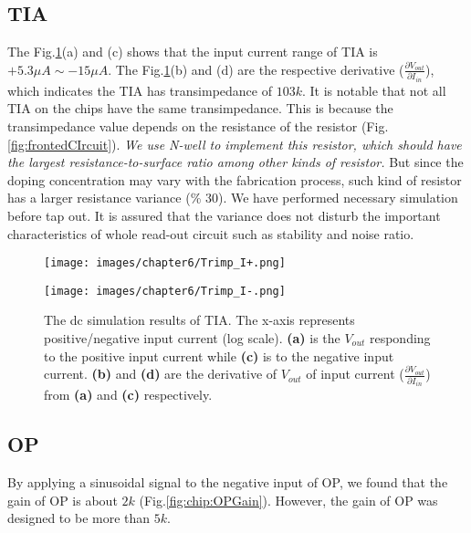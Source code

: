 \subsection{TIA}
The Fig.\ref{fig:chip:TIA}(a) and (c) shows that the input current range of TIA is$+5.3\mu A \sim -15\mu A$.
The Fig.\ref{fig:chip:TIA}(b) and (d) are the respective derivative ($\frac{\partial V_{out}}{\partial I_{in}}$), which indicates the TIA has transimpedance of $103k$.
It is notable that not all TIA on the chips have the same transimpedance.
This is because the transimpedance value depends on the resistance of the resistor (Fig.\ref{fig:frontedCIrcuit}).
\emph{We use N-well to implement this resistor, which should have the largest resistance-to-surface ratio among other kinds of resistor.}
But since the doping concentration may vary with the fabrication process, such kind of resistor has a larger resistance variance (\% 30).
We have performed necessary simulation before tap out.
It is assured that the variance does not disturb the important characteristics of whole read-out circuit such as stability and noise ratio.

\begin{figure}[tbh!p]
    \centering
    \begin{minipage}[t]{0.8\textwidth}
        \texttt{[image: images/chapter6/Trimp\_I+.png]}
        \raggedleft
    \end{minipage}
    \hfill
    \centering
    \begin{minipage}[t]{0.8\textwidth}
        \texttt{[image: images/chapter6/Trimp\_I-.png]}
        \raggedleft
    \end{minipage}
    \caption{The dc simulation results of TIA. The x-axis represents positive/negative input current (log scale). \textbf{(a)} is the $V_{out}$ responding to the positive input current while \textbf{(c)} is to the negative input current.
                    \textbf{(b)} and \textbf{(d)} are the derivative of $V_{out}$ of input current ($\frac{\partial V_{out}}{\partial {I_{in}}}$) from \textbf{(a)} and \textbf{(c)} respectively.}
    \label{fig:chip:TIA}
\end{figure}




\subsection{OP} \label{sec:ch6:OP}
By applying a sinusoidal signal to the negative input of OP, we found that the gain of OP is about $2k$ (Fig.\ref{fig:chip:OPGain}).
However, the gain of OP was designed to be more than $5k$.

